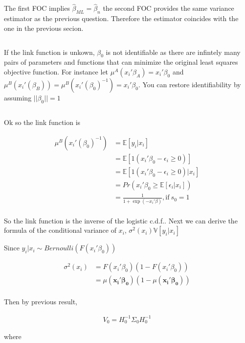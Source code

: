 \documentclass[12pt]{article}
\newcommand{\E}{\mathbb{E}}
\newcommand{\V}{\mathbb{V}}
\begin{document}
The first FOC implies $\hat\beta_{ML} = \hat\beta_n$ the second FOC provides the same variance estimator as the previous question. Therefore the estimator coincides with the one in the previous secion.

\subsection{}
If the link function is unkown, $\beta_0$ is not identifiable as there are infintely many pairs of parameters and functions that can minimize the original least squares objective function. For instance let $\mu^A(x_i'\beta_A) = x_i'\beta_0 $  and $\mu^B(x_i'(\beta_B))  = \mu^B(x_i'(\beta_0)^{-1}) = x_i'\beta_0  $. You can restore identifiability by assuming $||\beta_0|| = 1$

\subsection{}

Ok so the link function is

\begin{align*}
\mu^B(x_i'(\beta_0)^{-1}) &= \E[y_i|x_i] \\
  &= \E[1(x_i'\beta_0 - \epsilon_i \geq 0)]\\
 &=   \E[1(x_i'\beta_0 - \epsilon_i \geq 0)|x_i]\\
 &=   Pr(x_i'\beta_0 \geq \E[\epsilon_i |x_i])\\
 &=   \frac{1}{1+\exp(-x_i'\beta)}, \text{if} \ s_0=1\\
\end{align*}

So the link function is the inverse of the logistic c.d.f.. Next we can derive the formula of the conditional variance of $x_i$, $\sigma^2(x_i)\V[y_i|x_i]$

Since $y_i|x_i \sim Bernoulli(F(x_i'\beta_0))$

\begin{align*}
\sigma^2(x_i) &= F(x_i'\beta_0)(1-F(x_i'\beta_0))\\
 &= \mu(\mathbf{x_i'\beta_0})(1-\mu(\mathbf{x_i'\beta_0}))\\
\end{align*}

Then by previous result,

\begin{align*}
  V_0 = H^{-1}_0\Sigma_0H^{-1}_0
\end{align*}

where
\end{document}

